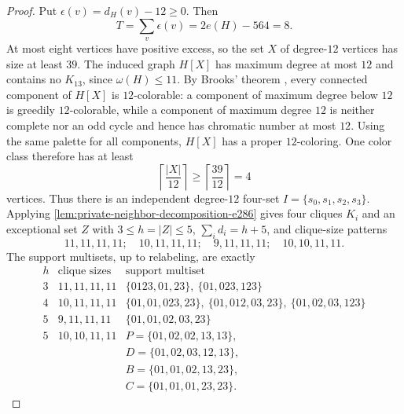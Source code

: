 \begin{proof}
Put $\epsilon(v)=d_H(v)-12\geq0$. Then
\[
T=\sum_v\epsilon(v)=2e(H)-564=8.
\]
At most eight vertices have positive excess, so the set $X$ of degree-$12$ vertices has size at least $39$. The induced graph $H[X]$ has maximum degree at most $12$ and contains no $K_{13}$, since $\omega(H)\leq11$. By Brooks' theorem \citep{Brooks1941}, every connected component of $H[X]$ is $12$-colorable: a component of maximum degree below $12$ is greedily $12$-colorable, while a component of maximum degree $12$ is neither complete nor an odd cycle and hence has chromatic number at most $12$. Using the same palette for all components, $H[X]$ has a proper $12$-coloring. One color class therefore has at least
\[
\left\lceil\frac{|X|}{12}\right\rceil\geq
\left\lceil\frac{39}{12}\right\rceil=4
\]
vertices. Thus there is an independent degree-$12$ four-set $I=\{s_0,s_1,s_2,s_3\}$. Applying \cref{lem:private-neighbor-decomposition-e286} gives four cliques $K_i$ and an exceptional set $Z$ with $3\leq h=|Z|\leq5$, $\sum_i d_i=h+5$, and clique-size patterns
\[
11,11,11,11;\quad 10,11,11,11;\quad
9,11,11,11;\quad 10,10,11,11.
\]
The support multisets, up to relabeling, are exactly
\[
\begin{array}{c|c|l}
h&\text{clique sizes}&\text{support multiset}\\ \hline
3&11,11,11,11&
\{0123,01,23\},\ \{01,023,123\}\\
4&10,11,11,11&
\{01,01,023,23\},\
\{01,012,03,23\},\
\{01,02,03,123\}\\
5&9,11,11,11&
\{01,01,02,03,23\}\\
5&10,10,11,11&
P=\{01,02,02,13,13\},\\
&&D=\{01,02,03,12,13\},\\
&&B=\{01,01,02,13,23\},\\
&&C=\{01,01,01,23,23\}.
\end{array}
\]

\end{proof}
